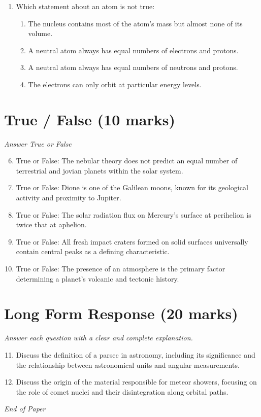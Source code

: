 \documentclass[12pt]{article}
\begin{document}
\begin{enumerate}[label=\arabic*.]
\begin{enumerate}[label=(\alph*)]
    \item Meteor Crater in Arizona.
\end{enumerate}
\item Which statement about an atom is not true:
\begin{enumerate}[label=(\alph*)]
    \item The nucleus contains most of the atom's mass but almost none of its volume.
    \item A neutral atom always has equal numbers of electrons and protons.
    \item A neutral atom always has equal numbers of neutrons and protons.
    \item The electrons can only orbit at particular energy levels.
\end{enumerate}
\end{enumerate}

\section*{True / False (10 marks)}
\textit{Answer True or False}
\begin{enumerate}[label=\arabic*.]
\setcounter{enumi}{5}
\item True or False: The nebular theory does not predict an equal number of terrestrial and jovian planets within the solar system.
\item True or False: Dione is one of the Galilean moons, known for its geological activity and proximity to Jupiter.
\item True or False: The solar radiation flux on Mercury's surface at perihelion is twice that at aphelion.
\item True or False: All fresh impact craters formed on solid surfaces universally contain central peaks as a defining characteristic.
\item True or False: The presence of an atmosphere is the primary factor determining a planet's volcanic and tectonic history.
\end{enumerate}

\section*{Long Form Response (20 marks)}
\textit{Answer each question with a clear and complete explanation.}
\begin{enumerate}[label=\arabic*.]
\setcounter{enumi}{10}
\item Discuss the definition of a parsec in astronomy, including its significance and the relationship between astronomical units and angular measurements.
\item Discuss the origin of the material responsible for meteor showers, focusing on the role of comet nuclei and their disintegration along orbital paths.
\end{enumerate}

\vfill
\noindent\textit{End of Paper}
\end{document}
